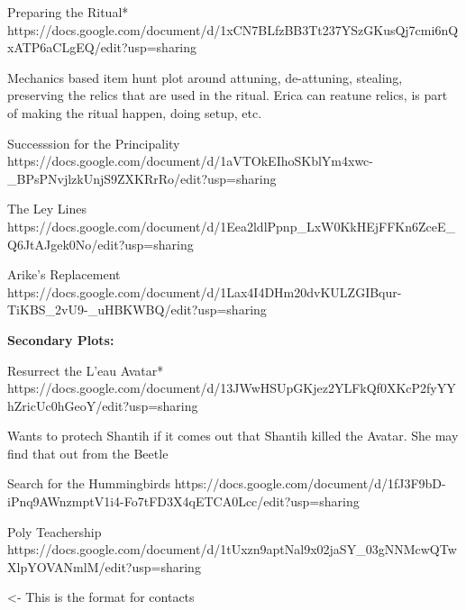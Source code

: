 \documentclass[char]{GL2020}
\begin{document}
Preparing the Ritual*
https://docs.google.com/document/d/1xCN7BLfzBB3Tt237YSzGKusQj7cmi6nQxATP6aCLgEQ/edit?usp=sharing

Mechanics based item hunt plot around attuning, de-attuning, stealing, preserving the relics that are used in the ritual. Erica can reatune relics, is part of making the ritual happen, doing setup, etc.

Successsion for the Principality
https://docs.google.com/document/d/1aVTOkEIhoSKblYm4xwc-_BPsPNvjlzkUnjS9ZXKRrRo/edit?usp=sharing

The Ley Lines
https://docs.google.com/document/d/1Eea2ldlPpnp_LxW0KkHEjFFKn6ZceE_Q6JtAJgek0No/edit?usp=sharing

Arike's Replacement
https://docs.google.com/document/d/1Lax4I4DHm20dvKULZGIBqur-TiKBS_2vU9-_uHBKWBQ/edit?usp=sharing



\textbf{Secondary Plots:}

Resurrect the L'eau Avatar*
https://docs.google.com/document/d/13JWwHSUpGKjez2YLFkQf0XKcP2fyYYhZricUc0hGeoY/edit?usp=sharing

Wants to protech Shantih if it comes out that Shantih killed the Avatar.  She may find that out from the Beetle

Search for the Hummingbirds
https://docs.google.com/document/d/1fJ3F9bD-iPnq9AWnzmptV1i4-Fo7tFD3X4qETCA0Lcc/edit?usp=sharing

Poly Teachership
https://docs.google.com/document/d/1tUxzn9aptNal9x02jaSY_03gNNMcwQTwXlpYOVANmlM/edit?usp=sharing



\begin{itemz}[Goals]
	\item 
\end{itemz}

\begin{itemz}[Notes]
	\item 
\end{itemz}

\begin{contacts}
	\contact{\cTest{}} <- This is the format for contacts 
\end{contacts}
\end{document}
